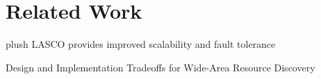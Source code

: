 \section{Related Work}

plush LASCO provides improved scalability and fault tolerance

Design and Implementation Tradeoffs for Wide-Area Resource Discovery

